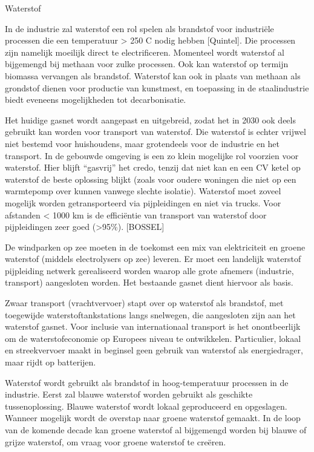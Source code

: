 \begin{voorstel}{Waterstof}
\begin{multicols*}{2}
\begin{overwegingen}
In de industrie zal waterstof een rol spelen als brandstof voor industriële processen die een temperatuur > 250 C nodig hebben [Quintel]. Die processen zijn namelijk moeilijk direct te electrificeren. Momenteel wordt waterstof al bijgemengd bij methaan voor zulke processen. Ook kan waterstof op termijn biomassa vervangen als brandstof. Waterstof kan ook in plaats van methaan als grondstof dienen voor productie van kunstmest, en toepassing in de staalindustrie biedt eveneens mogelijkheden tot decarbonisatie.

Het huidige gasnet wordt aangepast en uitgebreid, zodat het in 2030 ook deels gebruikt kan worden voor transport van waterstof. Die waterstof is echter vrijwel niet bestemd voor huishoudens, maar grotendeels voor de industrie en het transport. In de gebouwde omgeving is een zo klein mogelijke rol voorzien voor waterstof. Hier blijft “gasvrij” het credo, tenzij dat niet kan en een CV ketel op waterstof de beste oplossing blijkt (zoals voor oudere woningen die niet op een warmtepomp over kunnen vanwege slechte isolatie). Waterstof moet zoveel mogelijk worden getransporteerd via pijpleidingen en niet via trucks. Voor afstanden < 1000 km is de efficiëntie van transport van waterstof door pijpleidingen zeer goed (>95\%). [BOSSEL]

\end{overwegingen}

\begin{aanbevelingen}
De windparken op zee moeten in de toekomst een mix van elektriciteit en groene waterstof (middels electrolysers op zee) leveren.
Er moet een landelijk waterstof pijpleiding netwerk gerealiseerd worden waarop alle grote afnemers (industrie, transport) aangesloten worden. Het bestaande gasnet dient hiervoor als basis.

Zwaar transport (vrachtvervoer) stapt over op waterstof als brandstof, met toegewijde waterstoftankstations langs snelwegen, die aangesloten zijn aan het waterstof gasnet. Voor inclusie van internationaal transport is het onontbeerlijk om de waterstofeconomie op Europees niveau te ontwikkelen. Particulier, lokaal en streekvervoer maakt in beginsel geen gebruik van waterstof als energiedrager, maar rijdt op batterijen.

Waterstof wordt gebruikt als brandstof in hoog-temperatuur processen in de industrie. Eerst zal blauwe waterstof worden gebruikt als geschikte tussenoplossing. Blauwe waterstof wordt lokaal geproduceerd en opgeslagen. Wanneer mogelijk wordt de overstap naar groene waterstof gemaakt. In de loop van de komende decade kan groene waterstof al bijgemengd worden bij blauwe of grijze waterstof, om vraag voor groene waterstof te creëren.


\end{aanbevelingen}
\end{multicols*}
\end{voorstel}
